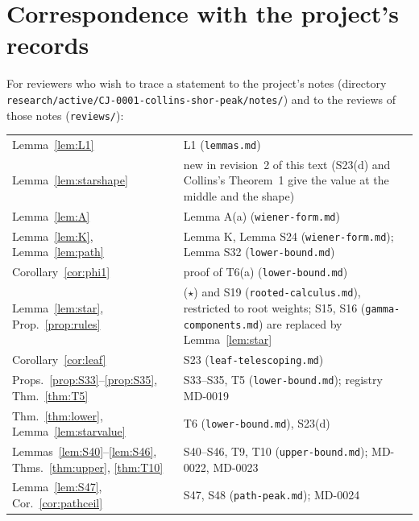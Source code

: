 \documentclass[11pt]{amsart}
\theoremstyle{definition}
\theoremstyle{remark}
\begin{document}
\appendix

\section{Correspondence with the project's records}\label{app:map}

For reviewers who wish to trace a statement to the project's notes
(directory \nolinkurl{research/active/CJ-0001-collins-shor-peak/notes/}) and to
the reviews of those notes (\nolinkurl{reviews/}):

\smallskip
\noindent\begin{tabular}{@{}p{}p{}@{}}
Lemma~\ref{lem:L1} & L1 (\nolinkurl{lemmas.md})\\
Lemma~\ref{lem:starshape} & new in revision~2 of this text (S23(d) and Collins's Theorem~1 give the value at the middle and the shape)\\
Lemma~\ref{lem:A} & Lemma A(a) (\nolinkurl{wiener-form.md})\\
Lemma~\ref{lem:K}, Lemma~\ref{lem:path} & Lemma K, Lemma S24 (\nolinkurl{wiener-form.md}); Lemma S32 (\nolinkurl{lower-bound.md})\\
Corollary~\ref{cor:phi1} & proof of T6(a) (\nolinkurl{lower-bound.md})\\
Lemma~\ref{lem:star}, Prop.~\ref{prop:rules} & (\(\star\)) and S19 (\nolinkurl{rooted-calculus.md}), restricted to root weights; S15, S16 (\nolinkurl{gamma-components.md}) are replaced by Lemma~\ref{lem:star}\\
Corollary~\ref{cor:leaf} & S23 (\nolinkurl{leaf-telescoping.md})\\
Props.~\ref{prop:S33}--\ref{prop:S35}, Thm.~\ref{thm:T5} & S33--S35, T5 (\nolinkurl{lower-bound.md}); registry MD-0019\\
Thm.~\ref{thm:lower}, Lemma~\ref{lem:starvalue} & T6 (\nolinkurl{lower-bound.md}), S23(d)\\
Lemmas~\ref{lem:S40}--\ref{lem:S46}, Thms.~\ref{thm:upper}, \ref{thm:T10} & S40--S46, T9, T10 (\nolinkurl{upper-bound.md}); MD-0022, MD-0023\\
Lemma~\ref{lem:S47}, Cor.~\ref{cor:pathceil} & S47, S48 (\nolinkurl{path-peak.md}); MD-0024\\
\end{tabular}
\end{document}
